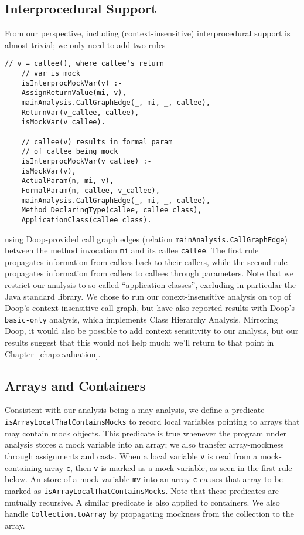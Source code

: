 \subsection{Interprocedural Support} 

From our perspective, including (context-insensitive) interprocedural support is almost trivial; we only need to add two rules
\begin{lstlisting}[basicstyle=\ttfamily\small,numbers=none]
	// v = callee(), where callee's return 
	// var is mock
	isInterprocMockVar(v) :-
	AssignReturnValue(mi, v),
	mainAnalysis.CallGraphEdge(_, mi, _, callee),
	ReturnVar(v_callee, callee),
	isMockVar(v_callee).
	
	// callee(v) results in formal param 
	// of callee being mock
	isInterprocMockVar(v_callee) :-
	isMockVar(v),
	ActualParam(n, mi, v),
	FormalParam(n, callee, v_callee),
	mainAnalysis.CallGraphEdge(_, mi, _, callee),
	Method_DeclaringType(callee, callee_class),
	ApplicationClass(callee_class).
\end{lstlisting}
using Doop-provided call graph edges (relation \texttt{mainAnalysis.CallGraphEdge}) between the method invocation {\tt mi} and its callee {\tt callee}. The first rule propagates information from callees back to their callers, while the second rule propagates information from callers to callees through parameters. Note that we restrict our analysis to so-called ``application classes'', excluding in particular the Java standard library. We chose to run our conext-insensitive analysis on top of Doop's context-insensitive call graph, but have also reported results with Doop's \texttt{basic-only} analysis, which implements Class Hierarchy Analysis. Mirroring Doop, it would also be possible to add context sensitivity to our analysis, but our results suggest that this would not help much; we'll return to that point in Chapter~\ref{chap:evaluation}.

\subsection{Arrays and Containers} 

Consistent with our analysis being a may-analysis, we define a predicate \\ {\tt isArrayLocalThatContainsMocks} to record local variables pointing to arrays that may contain mock objects. This predicate is true whenever the program under analysis stores a mock variable into an array; we also transfer array-mockness through assignments and casts. When a local variable \texttt{v} is read from a mock-containing array \texttt{c}, then \texttt{v} is marked as a mock variable, as seen in the first rule below. An store of a mock variable \texttt{mv} into an array \texttt{c} causes that array to be marked as \texttt{isArrayLocalThatContainsMocks}. Note that these predicates are mutually recursive. A similar predicate is also applied to containers. We also handle {\tt Collection.toArray} by propagating mockness from the collection to the array.

